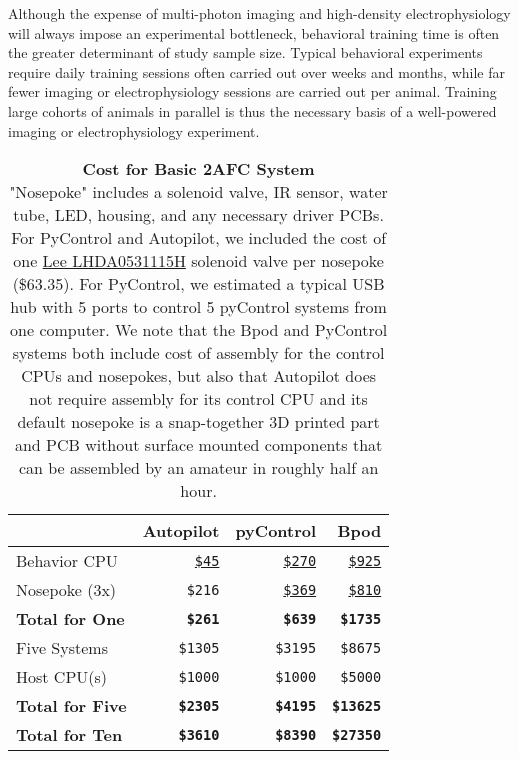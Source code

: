 Although the expense of multi-photon imaging and high-density electrophysiology will always impose an experimental bottleneck, behavioral training time is often the greater determinant of study sample size. Typical behavioral experiments require daily training sessions often carried out over weeks and months, while far fewer imaging or electrophysiology sessions are carried out per animal.  Training large cohorts of animals in parallel is thus the necessary basis of a well-powered imaging or electrophysiology experiment.


\begin{table}[hb!]
\caption{\textbf{Cost for Basic 2AFC System}\\
\noindent"Nosepoke" includes a solenoid valve, IR sensor, water tube, LED, housing, and any necessary driver PCBs. For PyControl and Autopilot, we included the cost of one \href{https://wiki.auto-pi-lot.com/index.php/Lee_LHDA0531115H}{Lee LHDA0531115H} solenoid valve per nosepoke (\$63.35). For PyControl, we estimated a typical USB hub with 5 ports to control 5 pyControl systems from one computer. We note that the Bpod and PyControl systems both include cost of assembly for the control CPUs and nosepokes, but also that Autopilot does not require assembly for its control CPU and its default nosepoke is a snap-together 3D printed part and PCB without surface mounted components that can be assembled by an amateur in roughly half an hour.}
\label{tab:cost}
\noindent\begin{tabularx}{\linewidth}{XRRR}\toprule
& Autopilot & pyControl & Bpod  \\
\midrule
Behavior CPU & 
\href{https://www.adafruit.com/product/4292}{\texttt{\$45}} & 
\href{https://open-ephys.org/pycontrol/pycontrol}{\texttt{\$270}} & 
\href{https://sanworks.io/shop/viewproduct?productID=1024}{\texttt{\$925}}\\
Nosepoke (3x) & 
\texttt{\$216} & 
\href{http://www.open-ephys.org/store/pycontrol-peripherals}{\texttt{\$369}} & 
\href{https://sanworks.io/shop/viewproduct?productID=1009}{\texttt{\$810}} \\
\textbf{Total for One} & 
\textbf{\texttt{\$261}} & 
\textbf{\texttt{\$639}} & 
\textbf{\texttt{\$1735}}\\
\midrule
Five Systems & 
\texttt{\$1305} & 
\texttt{\$3195} & 
\texttt{\$8675} \\
Host CPU(s) & 
\texttt{\$1000} & 
\texttt{\$1000} & 
\texttt{\$5000} \\
\textbf{Total for Five} & 
\textbf{\texttt{\$2305}} & 
\textbf{\texttt{\$4195}} & 
\textbf{\texttt{\$13625}} \\
\midrule
\textbf{Total for Ten} & 
\textbf{\texttt{\$3610}} & 
\textbf{\texttt{\$8390}} & 
\textbf{\texttt{\$27350}} \\
\bottomrule
\end{tabularx}
\end{table}
